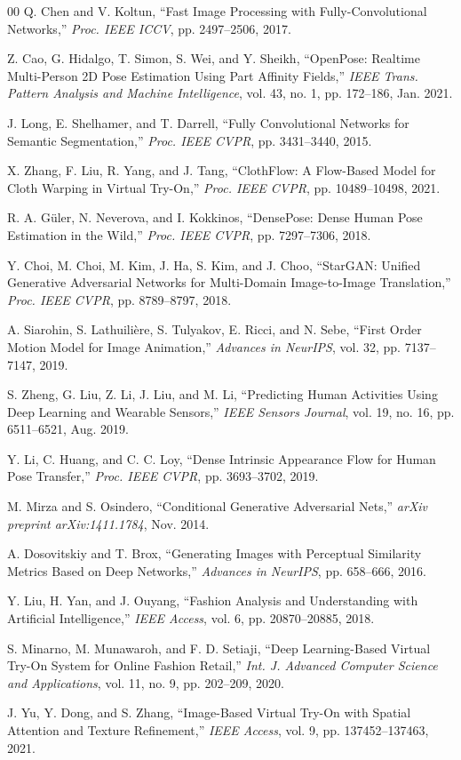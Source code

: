 \documentclass[conference]{IEEEtran}
\begin{document}
\begin{thebibliography}{00}
 Q. Chen and V. Koltun, ``Fast Image Processing with Fully-Convolutional Networks,'' \textit{Proc. IEEE ICCV}, pp. 2497--2506, 2017.

 Z. Cao, G. Hidalgo, T. Simon, S. Wei, and Y. Sheikh, ``OpenPose: Realtime Multi-Person 2D Pose Estimation Using Part Affinity Fields,'' \textit{IEEE Trans. Pattern Analysis and Machine Intelligence}, vol. 43, no. 1, pp. 172--186, Jan. 2021.

 J. Long, E. Shelhamer, and T. Darrell, ``Fully Convolutional Networks for Semantic Segmentation,'' \textit{Proc. IEEE CVPR}, pp. 3431--3440, 2015.

 X. Zhang, F. Liu, R. Yang, and J. Tang, ``ClothFlow: A Flow-Based Model for Cloth Warping in Virtual Try-On,'' \textit{Proc. IEEE CVPR}, pp. 10489--10498, 2021.

 R. A. G\"{u}ler, N. Neverova, and I. Kokkinos, ``DensePose: Dense Human Pose Estimation in the Wild,'' \textit{Proc. IEEE CVPR}, pp. 7297--7306, 2018.

 Y. Choi, M. Choi, M. Kim, J. Ha, S. Kim, and J. Choo, ``StarGAN: Unified Generative Adversarial Networks for Multi-Domain Image-to-Image Translation,'' \textit{Proc. IEEE CVPR}, pp. 8789--8797, 2018.

 A. Siarohin, S. Lathuilière, S. Tulyakov, E. Ricci, and N. Sebe, ``First Order Motion Model for Image Animation,'' \textit{Advances in NeurIPS}, vol. 32, pp. 7137--7147, 2019.

 S. Zheng, G. Liu, Z. Li, J. Liu, and M. Li, ``Predicting Human Activities Using Deep Learning and Wearable Sensors,'' \textit{IEEE Sensors Journal}, vol. 19, no. 16, pp. 6511--6521, Aug. 2019.

 Y. Li, C. Huang, and C. C. Loy, ``Dense Intrinsic Appearance Flow for Human Pose Transfer,'' \textit{Proc. IEEE CVPR}, pp. 3693--3702, 2019.

 M. Mirza and S. Osindero, ``Conditional Generative Adversarial Nets,'' \textit{arXiv preprint arXiv:1411.1784}, Nov. 2014.

 A. Dosovitskiy and T. Brox, ``Generating Images with Perceptual Similarity Metrics Based on Deep Networks,'' \textit{Advances in NeurIPS}, pp. 658--666, 2016.

 Y. Liu, H. Yan, and J. Ouyang, ``Fashion Analysis and Understanding with Artificial Intelligence,'' \textit{IEEE Access}, vol. 6, pp. 20870--20885, 2018.

 S. Minarno, M. Munawaroh, and F. D. Setiaji, ``Deep Learning-Based Virtual Try-On System for Online Fashion Retail,'' \textit{Int. J. Advanced Computer Science and Applications}, vol. 11, no. 9, pp. 202--209, 2020.

 J. Yu, Y. Dong, and S. Zhang, ``Image-Based Virtual Try-On with Spatial Attention and Texture Refinement,'' \textit{IEEE Access}, vol. 9, pp. 137452--137463, 2021.

\end{thebibliography}
\end{document}
